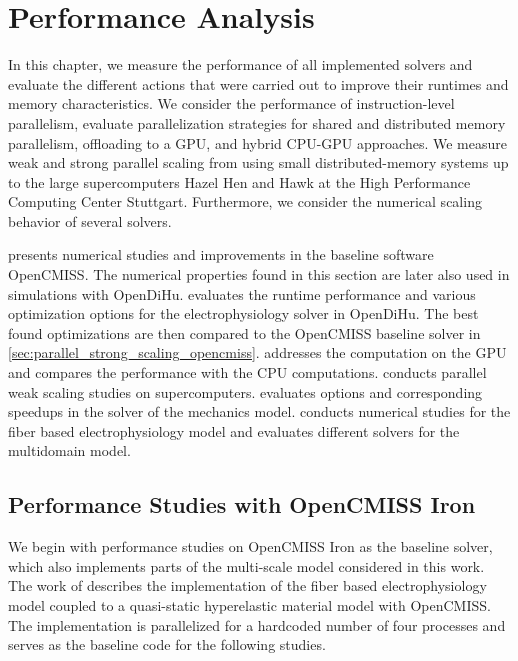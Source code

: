 

\chapter{Performance Analysis}\label{sec:performance_analysis}

In this chapter, we measure the performance of all implemented solvers and evaluate the different actions that were carried out to improve their runtimes and memory characteristics.
We consider the performance of instruction-level parallelism, evaluate parallelization strategies for shared and distributed memory parallelism, offloading to a GPU, and hybrid CPU-GPU  approaches. We measure weak and strong parallel scaling from using small distributed-memory systems up to the large supercomputers Hazel Hen and Hawk at the High Performance Computing Center Stuttgart. Furthermore, we consider the numerical scaling behavior of several solvers.

 presents numerical studies and improvements in the baseline software OpenCMISS. The numerical properties found in this section are later also used in simulations with OpenDiHu.  evaluates the runtime performance and various optimization options for the electrophysiology solver in OpenDiHu. The best found optimizations are then compared to the OpenCMISS baseline solver in \cref{sec:parallel_strong_scaling_opencmiss}.
 addresses the computation on the GPU and compares the performance with the CPU computations.
 conducts parallel weak scaling studies on supercomputers.
 evaluates options and corresponding speedups in the solver of the mechanics model.
 conducts numerical studies for the fiber based electrophysiology model and evaluates different solvers for the multidomain model.

\section{Performance Studies with OpenCMISS Iron}\label{sec:performance_opencmiss_iron}

We begin with performance studies on OpenCMISS Iron as the baseline solver, which also implements parts of the multi-scale model considered in this work. The work of \cite{Heidlauf2013} describes the implementation of the fiber based electrophysiology model coupled to a quasi-static hyperelastic material model with OpenCMISS. The implementation is parallelized for a hardcoded number of four processes and serves as the baseline code for the following studies.

